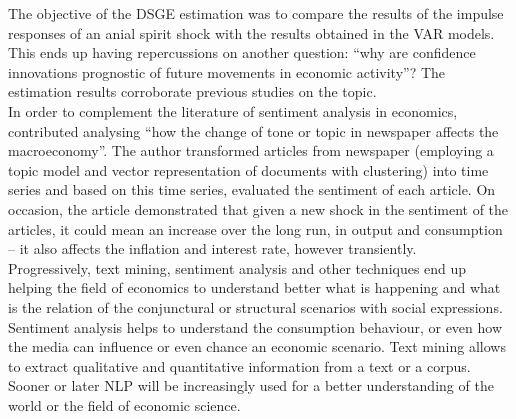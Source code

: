 The objective of the DSGE estimation was to compare the results of the impulse responses of an anial spirit shock with the results obtained in the VAR models. This ends up having repercussions on another question: ``why are confidence innovations prognostic of future movements in economic activity''\cite[1356]{barsky2012information}? The estimation results corroborate previous studies \cite{rotemberg1997optimization, christiano2005nominal} on the topic.\\

%














In order to complement the literature of sentiment analysis in economics, \cite{ostapenko2020macroeconomic} contributed analysing “how the change of tone or topic in newspaper affects the macroeconomy”. The author transformed articles from newspaper (employing a topic model and vector representation of documents with clustering) into time series and based on this time series, evaluated the sentiment of each article. On occasion, the article demonstrated that given a new shock in the sentiment of the articles, it could mean an increase over the long run, in output and consumption – it also affects the inflation and interest rate, however transiently.\\

Progressively, text mining, sentiment analysis and other techniques end up helping the field of economics to understand better what is happening and what is the relation of the conjunctural or structural scenarios with social expressions. Sentiment analysis helps to understand the consumption behaviour, or even how the media can influence or even chance an economic scenario. Text mining allows to extract qualitative and quantitative information from a text or a corpus. Sooner or later NLP will be increasingly used for a better understanding of the world or the field of economic science.\\

